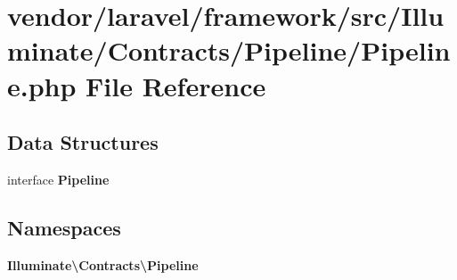 \section{vendor/laravel/framework/src/\+Illuminate/\+Contracts/\+Pipeline/\+Pipeline.php File Reference}
\label{_contracts_2_pipeline_2_pipeline_8php}
\subsection*{Data Structures}
\begin{DoxyCompactItemize}
\item 
interface {\bf Pipeline}
\end{DoxyCompactItemize}
\subsection*{Namespaces}
\begin{DoxyCompactItemize}
\item 
 {\bf Illuminate\textbackslash{}\+Contracts\textbackslash{}\+Pipeline}
\end{DoxyCompactItemize}
